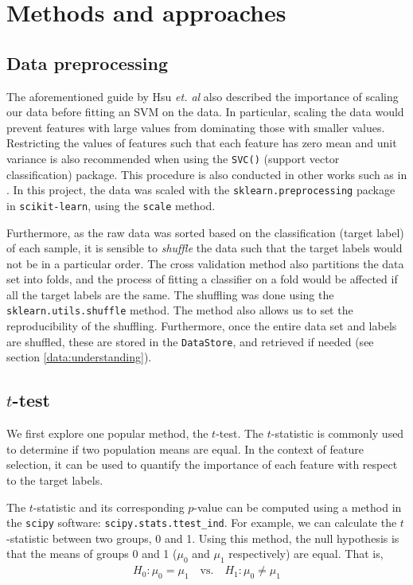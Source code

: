 \documentclass[12pt, twoside, a4paper]{report}
\begin{document}
\chapter{Methods and approaches}
\label{methods}

\section{Data preprocessing}

The aforementioned guide by Hsu \textit{et. al} also described the importance of scaling our data before fitting an SVM on the data. In particular, scaling the data would prevent features with large values from dominating those with smaller values. Restricting the values of features such that each feature has zero mean and unit variance is also recommended when using the \texttt{SVC()} (support vector classification) package. This procedure is also conducted in other works such as in \cite{RefWorks:228}. In this project, the data was scaled with the \texttt{sklearn.preprocessing} package in \texttt{scikit-learn}, using the \texttt{scale} method.

Furthermore, as the raw data was sorted based on the classification (target label) of each sample, it is sensible to \textit{shuffle} the data such that the target labels would not be in a particular order. The cross validation method also partitions the data set into folds, and the process of fitting a classifier on a fold would be affected if all the target labels are the same. The shuffling was done using the \texttt{sklearn.utils.shuffle} method. The method also allows us to set the reproducibility of the shuffling. Furthermore, once the entire data set and labels are shuffled, these are stored in the \texttt{DataStore}, and retrieved if needed (see section \ref{data:understanding}).

\section{$t$-test} \label{t-test}

We first explore one popular method, the $t$-test. The $t$-statistic is commonly used to determine if two population means are equal. In the context of feature selection, it can be used to quantify the importance of each feature with respect to the target labels.

The $t$-statistic and its corresponding $p$-value can be computed using a method in the \texttt{scipy} \cite{scipy} software: \texttt{scipy.stats.ttest\_ind}. For example, we can calculate the $t$-statistic between two groups, 0 and 1. Using this method, the null hypothesis is that the means of groups 0 and 1 ($\mu_0$ and $\mu_1$ respectively) are equal. That is,
\begin{align*}
H_0: \mu_0 = \mu_1 \quad \text{vs.} \quad H_1: \mu_0 \neq \mu_1
\end{align*}
\end{document}
